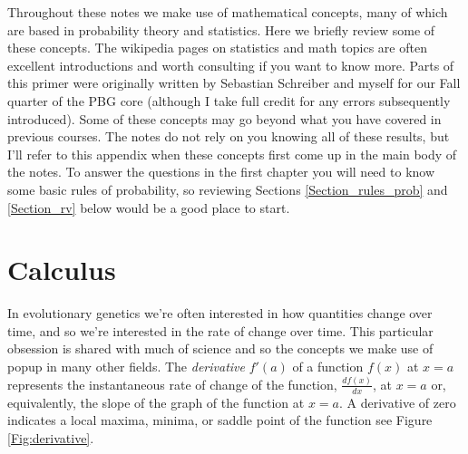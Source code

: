 Throughout these notes we make use of mathematical concepts, many of
which are based in probability theory and statistics. Here we briefly
review some of these concepts. The wikipedia pages on
statistics and math topics are often excellent introductions and
worth consulting if you want to know more. Parts of this primer were originally written by
Sebastian Schreiber and myself for our Fall quarter of the PBG core
(although I take full credit for any errors subsequently introduced).
Some of these concepts may go beyond what you have covered in previous
courses. The notes do not rely on you knowing all of these results, but I'll refer to this appendix when these concepts first come
up in the main body of the notes. To answer the questions in the first
chapter you will need to know some basic rules of probability, so
reviewing Sections \ref{Section_rules_prob} and \ref{Section_rv} below
would be  a good place to start.



\section{Calculus}
In evolutionary genetics we're often interested in how quantities
change over time, and so we're interested in the rate of change over
time. This particular obsession is shared with much of
science and so the concepts we make use of popup in many other fields. 
The \emph{derivative} $f'(a)$ of a function $f(x)$ at $x=a$ represents
the instantaneous rate of change of the function, $\frac{df(x)}{dx}$, at $x=a$ or,
equivalently, the slope of the graph of the function at $x=a$. A
derivative of zero indicates a local maxima, minima, or saddle point of the function see Figure \ref{Fig:derivative}.
    
